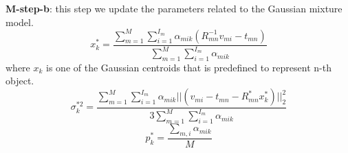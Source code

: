 \textbf{M-step-b}: this step we update the parameters related to the Gaussian mixture model. 
\begin{equation}
\label{equ:updatexk}
x_k^*=\frac{\sum_{m=1}^M\sum_{i=1}^{I_m}\alpha_{mik}(R_{mn}^{-1}v_{mi}-t_{mn})}{\sum_{m=1}^M\sum_{i=1}^{I_m}\alpha_{mik}}
\end{equation}
where $x_k$ is one of the Gaussian centroids that is predefined to represent n-th object. 
\begin{equation}
\label{equ:updatesigma}
\sigma_k^{*2}=\frac{\sum_{m=1}^M\sum_{i=1}^{I_m}\alpha_{mik}||(v_{mi}-t_{mn}-R_{mn}^*x_k^*)||_2^2}{3\sum_{m=1}^M\sum_{i=1}^{I_m}\alpha_{mik}}
\end{equation}
\begin{equation}
\label{equ:updatepk}
p_k^*=\frac{\sum_{m,i}\alpha_{mik}}{M}
\end{equation}
